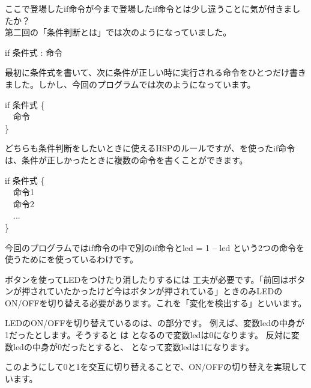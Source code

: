 ここで登場したif命令が今まで登場したif命令とは少し違うことに気が付きましたか？\\
第二回の「条件判断とは」では次のようになっていました。\\
\begin{center}
 					if 条件式 : 命令 \\
\end{center}
最初に条件式を書いて、次に条件が正しい時に実行される命令をひとつだけ書きました。しかし、今回のプログラムでは次のようになっています。\\
\begin{center}
  \begin{minipage}{4cm}
    if 条件式 \{\\ \ \ 命令\\ \}
  \end{minipage}
\end{center}
どちらも条件判断をしたいときに使えるHSPのルールですが、{}を使ったif命令は、条件が正しかったときに複数の命令を書くことができます。\\
\begin{center}
  \begin{minipage}{4cm}
					if 条件式 \{\\
					  \ \ 命令1\\
					  \ \ 命令2\\
					  \ \ ...\\
					\}\\
  \end{minipage}
\end{center}
今回のプログラムではif命令の中で別のif命令とled = 1 – led という2つの命令を使うために{}を使っているわけです。\\

\begin{center}

\end{center}

ボタンを使ってLEDをつけたり消したりするには 工夫が必要です。「前回はボタンが押されていたかったけど今はボタンが押されている」ときのみLEDのON/OFFを切り替える必要があります。これを「変化を検出する」といいます。

LEDのON/OFFを切り替えているのは、の部分です。
例えば、変数ledの中身が1だったとします。そうすると は となるので変数ledは0になります。
反対に変数ledの中身が0だったとすると、 となって変数ledは1になります。

このようにして0と1を交互に切り替えることで、ON/OFFの切り替えを実現しています。\\

